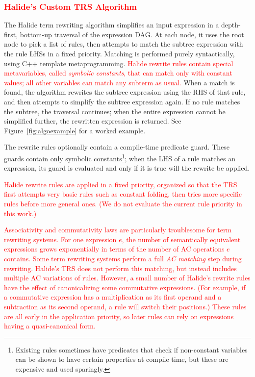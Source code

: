 \documentclass[acmsmall,review]{acmart}\settopmatter{printfolios=true,printccs=false,printacmref=false}
\newcommand{\modified}[1]{\textcolor{red}{{#1}}}
\begin{document}
\subsubsection{\modified{Halide's Custom TRS Algorithm}}
\label{sec:customalgo}
The Halide term rewriting algorithm simplifies an input expression in a
depth-first, bottom-up traversal of the expression DAG. At each node, it 
uses the root node to pick a list of rules, then
attempts to match the subtree expression with the rule LHSs in a fixed priority. Matching
is performed purely syntactically, using C++ template metaprogramming.
 \modified{Halide rewrite rules contain special metavariables,
called \emph{symbolic constants}, that can match only with constant values; all other
variables can match any subterm as usual.}
When a match is found, the algorithm rewrites the
subtree expression using the RHS of that rule, and then attempts to simplify the
subtree expression again. If no rule matches the subtree, the traversal
continues; when the entire expression cannot be simplified further, the
rewritten expression is returned. See Figure~\ref{fig:algoexample} for a worked
example.

The rewrite rules optionally contain a compile-time predicate guard. 
These guards contain only symbolic constants\footnote{Existing 
rules sometimes have predicates that check if
  non-constant variables can be shown to have certain properties at compile
  time, but these are expensive and used sparingly.}; when the LHS of a rule
matches an expression, its guard is evaluated and only if it
is true will the rewrite be applied.

\modified{Halide rewrite rules are applied in a fixed priority, organized so that the TRS 
first attempts very basic rules such as constant folding, then tries more specific 
rules before more general ones. (We do not evaluate the current rule priority in this work.)}

\modified{Associativity and commutativity laws are particularly troublesome for term rewriting systems. 
For one expression $e$, the number of semantically equivalent expressions grows 
exponentially in terms of the number of AC operations $e$ contains. Some term rewriting 
systems perform a full \emph{AC matching} step during rewriting. Halide's TRS does not
perform this matching, but instead
includes multiple AC variations of rules.
However, a small number of Halide's rewrite rules have the effect of canonicalizing some commutative
expressions. (For example, if a commutative expression has a multiplication as its 
first operand and a subtraction as its second operand, a rule will switch their positions.)
These rules are all early in the application priority, so later rules can rely on
expressions having a quasi-canonical form.}
\end{document}
